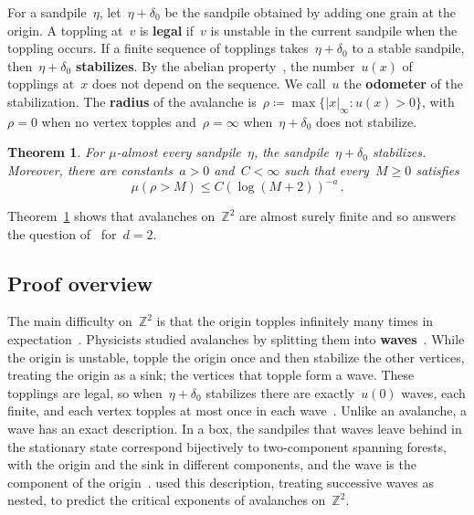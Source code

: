 \documentclass[11pt]{amsart}
\numberwithin{equation}{section}
\newtheorem{theorem}[equation]{Theorem}
\newcommand{\Z}{\mathbb Z}
\begin{document}
For a sandpile~$\eta$, let~$\eta+\delta_0$ be the sandpile obtained by adding one grain at the origin. A toppling at~$v$ is \textbf{legal} if~$v$ is unstable in the current sandpile when the toppling occurs. If a finite sequence of topplings takes~$\eta+\delta_0$ to a stable sandpile, then~$\eta+\delta_0$ \textbf{stabilizes}. By the abelian property~\citep{Dhar1990}, the number~$u(x)$ of topplings at~$x$ does not depend on the sequence. We call~$u$ the \textbf{odometer} of the stabilization. The \textbf{radius} of the avalanche is~$\rho\coloneqq\max\{|x|_\infty:u(x)>0\}$, with~$\rho=0$ when no vertex topples and~$\rho=\infty$ when~$\eta+\delta_0$ does not stabilize.

\begin{theorem}\label{th:main}
For $\mu$-almost every sandpile~$\eta$, the sandpile~$\eta+\delta_0$ stabilizes. Moreover, there are constants~$a>0$ and~$C<\infty$ such that every~$M\geq0$ satisfies
\begin{equation*}
\mu(\rho>M)\leq C(\log(M+2))^{-a}\,.
\end{equation*}
\end{theorem}

Theorem~\ref{th:main} shows that avalanches on~$\Z^2$ are almost surely finite and so answers the question of~\citet*{AthreyaJarai2004} for~$d=2$.

\subsection{Proof overview}\label{ssec:proof-overview}

The main difficulty on~$\Z^2$ is that the origin topples infinitely many times in expectation~\citep*{BhupatirajuHansonJarai2017}. Physicists studied avalanches by splitting them into \textbf{waves}~\citep*{IvashkevichKtitarevPriezzhev1994}. While the origin is unstable, topple the origin once and then stabilize the other vertices, treating the origin as a sink; the vertices that topple form a wave. These topplings are legal, so when~$\eta+\delta_0$ stabilizes there are exactly~$u(0)$ waves, each finite, and each vertex topples at most once in each wave~\citep*{BhupatirajuHansonJarai2017}. Unlike an avalanche, a wave has an exact description. In a box, the sandpiles that waves leave behind in the stationary state correspond bijectively to two-component spanning forests, with the origin and the sink in different components, and the wave is the component of the origin~\citep{IvashkevichKtitarevPriezzhev1994}. \citet*{PriezzhevKtitarevIvashkevich1996} used this description, treating successive waves as nested, to predict the critical exponents of avalanches on~$\Z^2$.
\end{document}
